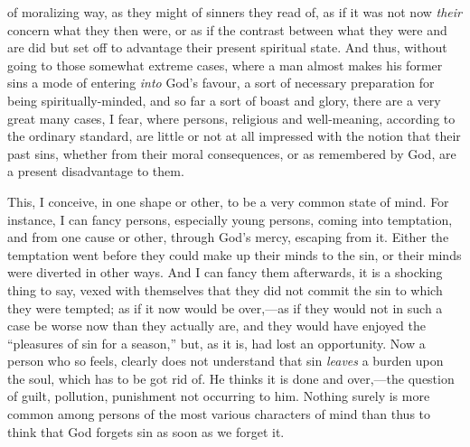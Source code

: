 of moralizing way, as they might of sinners they read of, as if it was
not now \emph{their} concern what they then were, or as if the contrast
between what they were and are did but set off to advantage their
present spiritual state. And thus, without going to those somewhat
extreme cases, where a man almost makes his former sins a mode of
entering \emph{into} God's favour, a sort of necessary preparation for being
spiritually-minded, and so far a sort of boast and glory, there are a
very great many cases, I fear, where persons, religious and
well-meaning, according to the ordinary standard, are little or not at
all impressed with the notion that their past sins, whether from their
moral consequences, or as remembered by God, are a present
disadvantage to them.

This, I conceive, in one shape or other, to be a very common state
of mind. For instance, I can fancy persons, especially young persons,
coming into temptation, and from one cause or other, through God's
mercy, escaping from it. Either the temptation went before they could
make up their minds to the sin, or their minds were diverted in other
ways. And I can fancy them afterwards, it is a shocking thing to say,
vexed with themselves that they did not commit the sin to which they
were tempted; as if it now would be over,—as if they would not in
such a case be worse now than they actually are, and they would have
enjoyed the ``pleasures of sin for a season,'' but, as it is,
had lost an opportunity. Now a person who so feels, clearly does not
understand that sin \emph{leaves} a burden upon the soul, which has to be got
rid of. He thinks it is done and over,—the question of guilt,
pollution, punishment not occurring to him. Nothing surely is more
common among persons of the most various characters of mind than thus
to think that God forgets sin as soon as we forget it.


